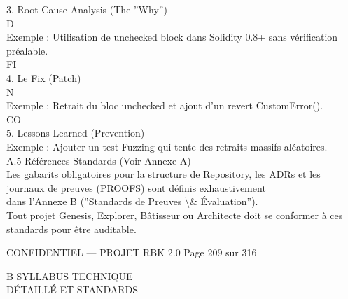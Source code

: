 \documentclass[12pt,landscape,a4paper]{article}
\newenvironment{confidential}
{\begin{tcolorbox}[
    colback=rbkred!5!white,
    colframe=rbkred!75!black,
    title=CONFIDENTIEL,
    fonttitle=\bfseries\color{white},
    coltitle=rbkred!75!black,
    breakable,
    enhanced,
    frame hidden,
    borderline west={2pt}{0pt}{rbkred!75!black}
]}
{\end{tcolorbox}}
\begin{document}
3. Root Cause Analysis (The ”Why”)\\
\vspace{0.5em}
\vspace{0.5em}
\vspace{0.5em}
\vspace{0.5em}
D\\
Exemple : Utilisation de unchecked block dans Solidity 0.8+ sans vérification préalable.\\
\vspace{0.5em}
\vspace{0.5em}
\vspace{0.5em}
\vspace{0.5em}
FI\\
4. Le Fix (Patch)\\
\vspace{0.5em}
N\\
Exemple : Retrait du bloc unchecked et ajout d’un revert CustomError().\\
CO\\
5. Lessons Learned (Prevention)\\
Exemple : Ajouter un test Fuzzing qui tente des retraits massifs aléatoires.\\
\vspace{0.5em}
\vspace{0.5em}
\vspace{0.5em}
A.5     Références Standards (Voir Annexe A)\\
Les gabarits obligatoires pour la structure de Repository, les ADRs et les journaux de preuves (PROOFS) sont définis exhaustivement\\
dans l’Annexe B (”Standards de Preuves \textbackslash{}& Évaluation”).\\
Tout projet Genesis, Explorer, Bâtisseur ou Architecte doit se conformer à ces standards pour être auditable.\\
\vspace{0.5em}
\vspace{0.5em}
\vspace{0.5em}
\vspace{0.5em}
\begin{confidential}CONFIDENTIEL — PROJET RBK 2.0                                   Page 209 sur 316\end{confidential}
B \textbar{} SYLLABUS TECHNIQUE\\
DÉTAILLÉ ET STANDARDS\\
\vspace{0.5em}
\vspace{0.5em}
\end{document}
